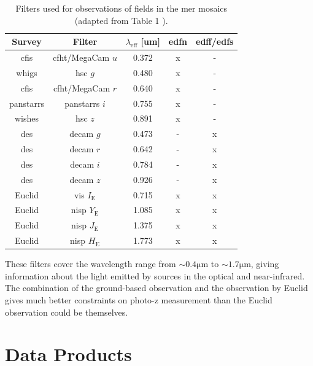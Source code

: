 \begin{table}[H]
    \centering
    \caption{Filters used for observations of fields in the \gls{mer} mosaics (adapted from Table 1 \citep{euclid_collaboration_euclid_2025}).}
    \label{tab:mer filters}
    \begin{tabular*}{\textwidth}{cc @{\extracolsep{\fill}}ccc}
    \hline 
    Survey & Filter & $\lambda_\mathrm{eff}$ [um] & \gls{edfn} & \gls{edff}/\gls{edfs} \\ 
    \hline \hline
    \gls{cfis} & \gls{cfht}/MegaCam $u$ & 0.372 & x & -  \\ 
    \hline 
    \gls{whigs} & \gls{hsc} $g$ & 0.480 & x & - \\
    \hline 
    \gls{cfis} & \gls{cfht}/MegaCam $r$ & 0.640 & x & -  \\ 
    \hline 
    \gls{panstarrs} & \gls{panstarrs} $i$ & 0.755 & x & -  \\ 
    \hline
    \gls{wishes} & \gls{hsc} $z$ & 0.891 & x & - \\ 
    \hline 
    \gls{des} & \gls{decam} $g$ & 0.473 & -  & x \\ 
    \hline
    \gls{des} & \gls{decam} $r$ & 0.642 & -  & x \\ 
    \hline
    \gls{des} & \gls{decam} $i$ & 0.784 & -  & x \\ 
    \hline
    \gls{des} & \gls{decam} $z$ & 0.926 & -  & x \\ 
    \hline
    Euclid & \gls{vis} $I_\mathrm{E}$ & 0.715 & x & x \\ 
    \hline
    Euclid & \gls{nisp} $Y_\mathrm{E}$ & 1.085 & x & x \\ 
    \hline
    Euclid & \gls{nisp} $J_\mathrm{E}$ & 1.375 & x & x \\ 
    \hline
    Euclid & \gls{nisp} $H_\mathrm{E}$ & 1.773 & x & x \\ 
\hline 
\end{tabular*} 
\end{table}
These filters cover the wavelength range from $\sim0.4\mathrm{\mu m}$ to $\sim1.7\mathrm{\mu m}$, giving information about the light emitted by sources in the optical and near-infrared. The combination of the ground-based observation and the observation by Euclid gives much better constraints on photo-z measurement than the Euclid observation could be themselves.

\section{Data Products}

